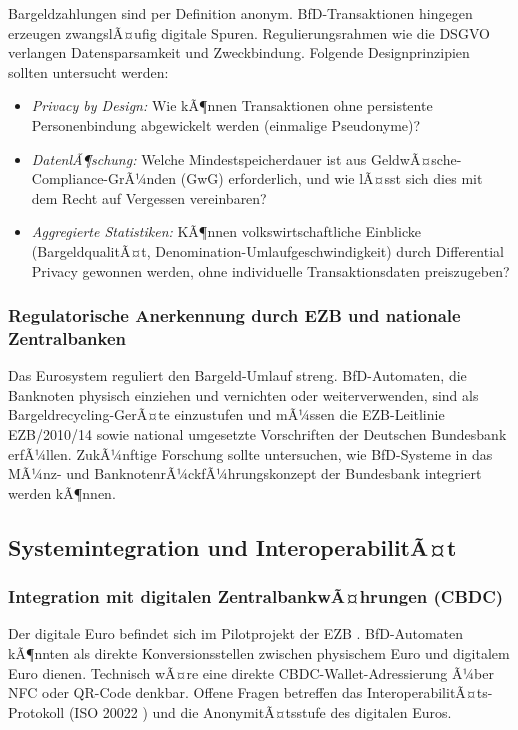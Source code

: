 ﻿\documentclass[a4paper,12pt]{article}
\theoremstyle{definition}
\begin{document}
Bargeldzahlungen sind per Definition anonym.  BfD-Transaktionen hingegen
erzeugen zwangslÃ¤ufig digitale Spuren.  Regulierungsrahmen wie die DSGVO \cite{gdpr2016}
verlangen Datensparsamkeit und Zweckbindung.  Folgende Designprinzipien sollten
untersucht werden:
\begin{itemize}
  \item \emph{Privacy by Design:} Wie kÃ¶nnen Transaktionen ohne persistente
        Personenbindung abgewickelt werden (einmalige Pseudonyme)?
  \item \emph{DatenlÃ¶schung:} Welche Mindestspeicherdauer ist aus
        GeldwÃ¤sche-Compliance-GrÃ¼nden (GwG) erforderlich, und wie lÃ¤sst
        sich dies mit dem Recht auf Vergessen vereinbaren?
  \item \emph{Aggregierte Statistiken:} KÃ¶nnen volkswirtschaftliche Einblicke
        (BargeldqualitÃ¤t, Denomination-Umlaufgeschwindigkeit) durch
        Differential Privacy \cite{dwork2006differential} gewonnen werden,
        ohne individuelle Transaktionsdaten preiszugeben?
\end{itemize}

\subsubsection{Regulatorische Anerkennung durch EZB und nationale Zentralbanken}

Das Eurosystem reguliert den Bargeld-Umlauf streng.  BfD-Automaten, die
Banknoten physisch einziehen und vernichten oder weiterverwenden,
sind als Bargeldrecycling-GerÃ¤te einzustufen und mÃ¼ssen die EZB-Leitlinie
EZB/2010/14 \cite{ecb2010} sowie national umgesetzte Vorschriften der Deutschen
Bundesbank \cite{bundesbank2024} erfÃ¼llen.
ZukÃ¼nftige Forschung sollte untersuchen, wie BfD-Systeme in das
MÃ¼nz- und BanknotenrÃ¼ckfÃ¼hrungskonzept der Bundesbank integriert werden kÃ¶nnen.

\subsection{Systemintegration und InteroperabilitÃ¤t}

\subsubsection{Integration mit digitalen ZentralbankwÃ¤hrungen (CBDC)}

Der digitale Euro befindet sich im Pilotprojekt der EZB \cite{ecb2023digital}.
BfD-Automaten kÃ¶nnten als direkte Konversionsstellen zwischen physischem Euro
und digitalem Euro dienen.  Technisch wÃ¤re eine direkte CBDC-Wallet-Adressierung
Ã¼ber NFC oder QR-Code denkbar.  Offene Fragen betreffen das InteroperabilitÃ¤ts-Protokoll
(ISO 20022 \cite{iso20022}) und die AnonymitÃ¤tsstufe des digitalen Euros.
\end{document}
